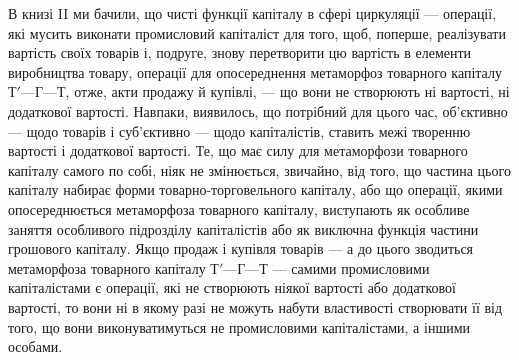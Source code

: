 В книзі II ми бачили, що чисті функції капіталу в сфері циркуляції
— операції, які мусить виконати промисловий капіталіст
для того, щоб, поперше, реалізувати вартість своїх товарів і,
подруге, знову перетворити цю вартість в елементи виробництва
товару, операції для опосереднення метаморфоз товарного
капіталу $Т' — Г — Т$, отже, акти продажу й купівлі, — що вони не
створюють ні вартості, ні додаткової вартості. Навпаки, виявилось,
що потрібний для цього час, об’єктивно — щодо товарів і суб’єктивно
— щодо капіталістів, ставить межі творенню вартості і
додаткової вартості. Те, що має силу для метаморфози товарного
капіталу самого по собі, ніяк не змінюється, звичайно, від
того, що частина цього капіталу набирає форми товарно-торговельного
капіталу, або що операції, якими опосереднюється метаморфоза
товарного капіталу, виступають як особливе заняття
особливого підрозділу капіталістів або як виключна функція частини
грошового капіталу. Якщо продаж і купівля товарів — а до
цього зводиться метаморфоза товарного капіталу $Т' — Г — Т$ —
самими промисловими капіталістами є операції, які не створюють
ніякої вартості або додаткової вартості, то вони ні в якому разі
не можуть набути властивості створювати її від того, що вони виконуватимуться
не промисловими капіталістами, а іншими особами.
\parbreak{}  %

